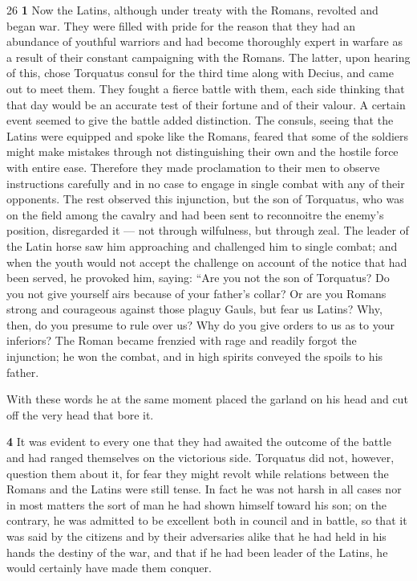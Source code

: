 26
\textbf{1} Now the Latins, although under treaty with the Romans, revolted and began war. They were filled with pride for the reason that they had an abundance of youthful warriors and had become thoroughly expert in warfare as a result of their constant campaigning with the Romans. The latter, upon hearing of this, chose Torquatus consul for the third time along with Decius, and came out to meet them. They fought a fierce battle with them, each side thinking that that day would be an accurate test of their fortune and of their valour. A certain event seemed to give the battle added distinction. The consuls, seeing that the Latins were equipped and spoke like the Romans, feared that some of the soldiers might make mistakes through not distinguishing their own and the hostile force with entire ease. Therefore they made proclamation to their men to observe instructions carefully and in no case to engage in single combat with any of their opponents. The rest observed this injunction, but the son of Torquatus, who was on the field among the cavalry and had been sent to reconnoitre the enemy's position, disregarded it \texthebrew{—} not through wilfulness, but through zeal. The leader of the Latin horse saw him approaching and challenged him to single combat; and when the youth would not accept the challenge on account of the notice that had been served, he provoked him, saying: ``Are you not the son of Torquatus? Do you not give yourself airs because of your father's collar? Or are you Romans strong and courageous against those plaguy Gauls, but fear us Latins? Why, then, do you presume to rule over us? Why do you give orders to us as to your inferiors? The Roman became frenzied with rage and readily forgot the injunction; he won the combat, and in high spirits conveyed the spoils to his father.

With these words he at the same moment placed the garland on his head and cut off the very head that bore it.

\textbf{4}
It was evident to every one that they had awaited the outcome of the battle and had ranged themselves on the victorious side. Torquatus did not, however, question them about it, for fear they might revolt while relations between the Romans and the Latins were still tense. In fact he was not harsh in all cases nor in most matters the sort of man he had shown himself toward his son; on the contrary, he was admitted to be excellent both in council and in battle, so that it was said by the citizens and by their adversaries alike that he had held in his hands the destiny of the war, and that if he had been leader of the Latins, he would certainly have made them conquer.

